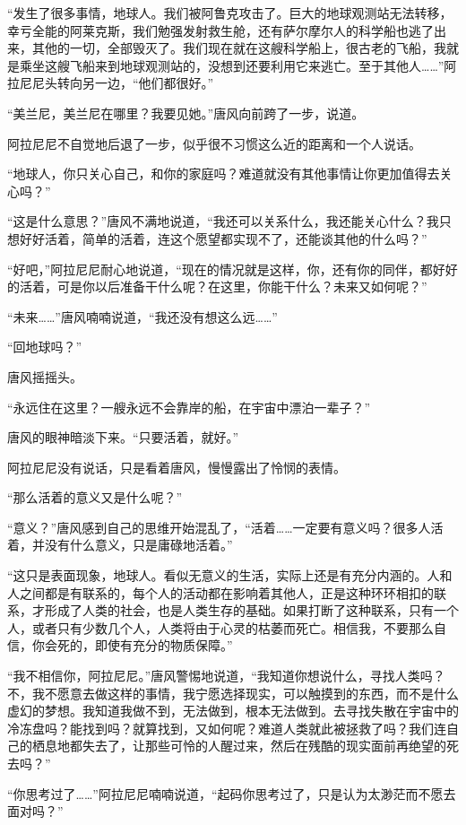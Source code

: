 “发生了很多事情，地球人。我们被阿鲁克攻击了。巨大的地球观测站无法转移，幸亏全能的阿莱克斯，我们勉强发射救生舱，还有萨尔摩尔人的科学船也逃了出来，其他的一切，全部毁灭了。我们现在就在这艘科学船上，很古老的飞船，我就是乘坐这艘飞船来到地球观测站的，没想到还要利用它来逃亡。至于其他人……”阿拉尼尼头转向另一边，“他们都很好。”

“美兰尼，美兰尼在哪里？我要见她。”唐风向前跨了一步，说道。

阿拉尼尼不自觉地后退了一步，似乎很不习惯这么近的距离和一个人说话。

“地球人，你只关心自己，和你的家庭吗？难道就没有其他事情让你更加值得去关心吗？”

“这是什么意思？”唐风不满地说道，“我还可以关系什么，我还能关心什么？我只想好好活着，简单的活着，连这个愿望都实现不了，还能谈其他的什么吗？”

“好吧，”阿拉尼尼耐心地说道，“现在的情况就是这样，你，还有你的同伴，都好好的活着，可是你以后准备干什么呢？在这里，你能干什么？未来又如何呢？”

“未来……”唐风喃喃说道，“我还没有想这么远……”

“回地球吗？”

唐风摇摇头。

“永远住在这里？一艘永远不会靠岸的船，在宇宙中漂泊一辈子？”

唐风的眼神暗淡下来。“只要活着，就好。”

阿拉尼尼没有说话，只是看着唐风，慢慢露出了怜悯的表情。

“那么活着的意义又是什么呢？”

“意义？”唐风感到自己的思维开始混乱了，“活着……一定要有意义吗？很多人活着，并没有什么意义，只是庸碌地活着。”

“这只是表面现象，地球人。看似无意义的生活，实际上还是有充分内涵的。人和人之间都是有联系的，每个人的活动都在影响着其他人，正是这种环环相扣的联系，才形成了人类的社会，也是人类生存的基础。如果打断了这种联系，只有一个人，或者只有少数几个人，人类将由于心灵的枯萎而死亡。相信我，不要那么自信，你会死的，即使有充分的物质保障。”

“我不相信你，阿拉尼尼。”唐风警惕地说道，“我知道你想说什么，寻找人类吗？不，我不愿意去做这样的事情，我宁愿选择现实，可以触摸到的东西，而不是什么虚幻的梦想。我知道我做不到，无法做到，根本无法做到。去寻找失散在宇宙中的冷冻盘吗？能找到吗？就算找到，又如何呢？难道人类就此被拯救了吗？我们连自己的栖息地都失去了，让那些可怜的人醒过来，然后在残酷的现实面前再绝望的死去吗？”

“你思考过了……”阿拉尼尼喃喃说道，“起码你思考过了，只是认为太渺茫而不愿去面对吗？”

